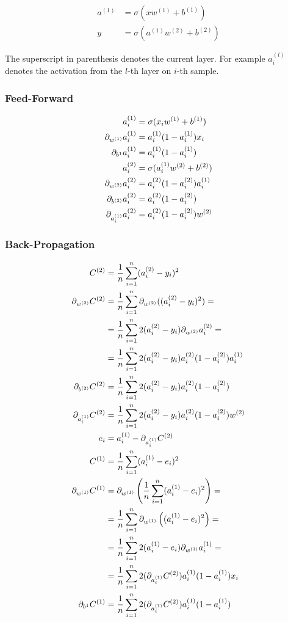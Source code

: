 \documentclass{article}
\begin{document}
\begin{align}
  a^{(1)} &= \sigma(xw^{(1)} + b^{(1)}) \\
  y &= \sigma(a^{(1)}w^{(2)} + b^{(2)})
\end{align}

The superscript in parenthesis denotes the current layer. For example $a_i^{(l)}$ denotes the activation from the $l$-th layer on $i$-th sample.

\subsubsection{Feed-Forward}

\begin{align}
  a_i^{(1)} &= \sigma(x_iw^{(1)} + b^{(1)}) \\
  \pd[w^{(1)}]a_i^{(1)} &= a_i^{(1)}(1 - a_i^{(1)})x_i \\
  \pd[b^{1}]a_i^{(1)} &= a_i^{(1)}(1 - a_i^{(1)}) \\
  a_i^{(2)} &= \sigma(a_i^{(1)}w^{(2)} + b^{(2)}) \\
  \pd[w^{(2)}]a_i^{(2)} &= a_i^{(2)}(1 - a_i^{(2)})a_i^{(1)} \\
  \pd[b^{(2)}]a_i^{(2)} &= a_i^{(2)}(1 - a_i^{(2)}) \\
  \pd[a_i^{(1)}]a_i^{(2)} &= a_i^{(2)}(1 - a_i^{(2)})w^{(2)}
\end{align}

\subsubsection{Back-Propagation}

\begin{align}
  C^{(2)} &= \avgsum[i, n] (a_i^{(2)} - y_i)^2 \\
  \pd[w^{(2)}] C^{(2)}
  &= \avgsum[i, n] \pd[w^{(2)}]((a_i^{(2)} - y_i)^2) = \\
  &= \avgsum[i, n] 2(a_i^{(2)} - y_i)\pd[w^{(2)}]a_i^{(2)} = \\
  &= \avgsum[i, n] 2(a_i^{(2)} - y_i)a_i^{(2)}(1 - a_i^{(2)})a_i^{(1)} \\
  \pd[b^{(2)}] C^{(2)} &= \avgsum[i, n] 2(a_i^{(2)} - y_i)a_i^{(2)}(1 - a_i^{(2)}) \\
  \pd[a_i^{(1)}]C^{(2)} &= \avgsum[i, n] 2(a_i^{(2)} - y_i)a_i^{(2)}(1 - a_i^{(2)})w^{(2)} \\
  e_i &= a_i^{(1)} - \pd[a_i^{(1)}]C^{(2)} \\
  C^{(1)} &= \avgsum[i, n] (a_i^{(1)} - e_i)^2 \\
  \pd[w^{(1)}]C^{(1)}
  &= \pd[w^{(1)}]\left(\avgsum[i, n] (a_i^{(1)} - e_i)^2\right) =\\
  &= \avgsum[i, n] \pd[w^{(1)}]\left((a_i^{(1)} - e_i)^2\right) =\\
  &= \avgsum[i, n] 2(a_i^{(1)} - e_i)\pd[w^{(1)}]a_i^{(1)} =\\
  &= \avgsum[i, n] 2(\pd[a_i^{(1)}]C^{(2)})a_i^{(1)}(1 - a_i^{(1)})x_i \\
  \pd[b^{1}]C^{(1)} &= \avgsum[i, n] 2(\pd[a_i^{(1)}]C^{(2)})a_i^{(1)}(1 - a_i^{(1)})
\end{align}
\end{document}
